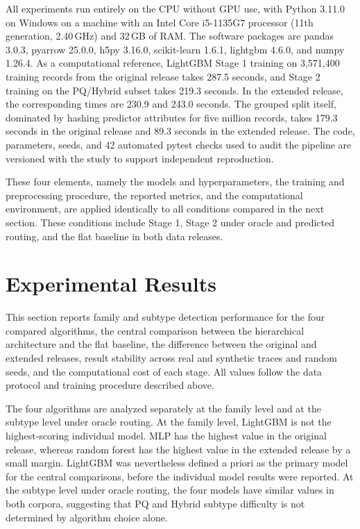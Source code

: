 \documentclass{IEEEoj}
\begin{document}
All experiments run entirely on the CPU without GPU use, with Python 3.11.0
on Windows on a machine with an Intel Core i5-1135G7 processor
(11th generation, 2.40\,GHz) and 32\,GB of RAM. The software packages are
pandas 3.0.3, pyarrow 25.0.0, h5py 3.16.0, scikit-learn 1.6.1, lightgbm 4.6.0,
and numpy 1.26.4. As a computational reference, LightGBM Stage 1 training on
3,571,400 training records from the original release takes 287.5 seconds, and
Stage 2 training on the PQ/Hybrid subset takes 219.3 seconds. In the extended
release, the corresponding times are 230.9 and 243.0 seconds. The grouped
split itself, dominated by hashing predictor attributes for five million
records, takes 179.3 seconds in the original release and 89.3 seconds in the
extended release. The code, parameters, seeds, and 42 automated pytest checks
used to audit the pipeline are versioned with the study to support independent
reproduction.

These four elements, namely the models and hyperparameters, the training and
preprocessing procedure, the reported metrics, and the computational
environment, are applied identically to all conditions compared in the next
section. These conditions include Stage 1, Stage 2 under oracle and predicted
routing, and the flat baseline in both data releases.

\section{Experimental Results}
This section reports family and subtype detection performance for the four
compared algorithms, the central comparison between the hierarchical
architecture and the flat baseline, the difference between the original and
extended releases, result stability across real and synthetic traces and
random seeds, and the computational cost of each stage. All values follow the
data protocol and training procedure described above.

The four algorithms are analyzed separately at the family level and at the
subtype level under oracle routing. At the family level, LightGBM is not the
highest-scoring individual model. MLP has the highest value in the original
release, whereas random forest has the highest value in the extended release
by a small margin. LightGBM was nevertheless defined a priori as the primary
model for the central comparisons, before the individual model results were
reported. At the subtype level under oracle routing, the four models have
similar values in both corpora, suggesting that PQ and Hybrid subtype
difficulty is not determined by algorithm choice alone.

\end{document}
